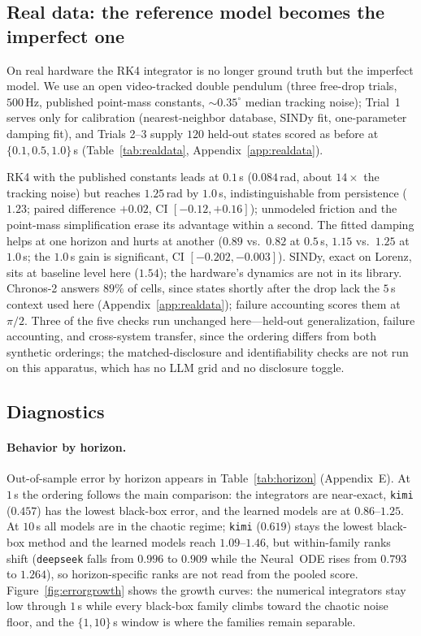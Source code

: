 \documentclass{article}
\begin{document}
\subsection{Real data: the reference model becomes the imperfect one}
\label{sec:realdata}
On real hardware the RK4 integrator is no longer ground truth but the imperfect model. We use
an open video-tracked double pendulum
\citep{myers2020pendulum} (three free-drop trials, $500$\,Hz, published point-mass constants,
${\sim}0.35^{\circ}$ median tracking noise); Trial~1 serves only for calibration (nearest-neighbor
database, SINDy fit, one-parameter damping fit), and Trials 2--3 supply $120$ held-out states
scored as before at $\{0.1,0.5,1.0\}$\,s (Table~\ref{tab:realdata},
Appendix~\ref{app:realdata}).

RK4 with the published constants leads at $0.1$\,s ($0.084$\,rad, about $14\times$ the
tracking noise) but reaches $1.25$\,rad by $1.0$\,s, indistinguishable from persistence
($1.23$; paired difference $+0.02$, CI $[-0.12,+0.16]$); unmodeled friction and the
point-mass simplification erase its advantage within a second. The fitted damping helps at one
horizon and hurts at another ($0.89$ vs.\ $0.82$ at $0.5$\,s, $1.15$ vs.\ $1.25$ at
$1.0$\,s; the $1.0$\,s gain is significant, CI $[-0.202,-0.003]$). SINDy, exact on Lorenz, sits at baseline level here
($1.54$); the hardware's dynamics are not in its library. Chronos-2 answers $89\%$ of cells,
since states shortly after the drop lack the $5$\,s context used here
(Appendix~\ref{app:realdata}); failure accounting scores them at $\pi/2$. Three of the five
checks run unchanged here---held-out generalization, failure accounting, and cross-system
transfer, since the ordering differs from both synthetic orderings; the matched-disclosure and
identifiability checks are not run on this apparatus, which has no LLM grid and no disclosure
toggle.

\subsection{Diagnostics}
\label{sec:behavior}
\paragraph{Behavior by horizon.}
Out-of-sample error by horizon appears in Table~\ref{tab:horizon} (Appendix~E). At $1$\,s the ordering
follows the main comparison: the integrators are near-exact, \texttt{kimi} ($0.457$) has the
lowest black-box error, and the learned models are at $0.86$--$1.25$. At $10$\,s all models
are in the chaotic regime; \texttt{kimi} ($0.619$) stays the lowest black-box method and the
learned models reach $1.09$--$1.46$, but within-family ranks shift (\texttt{deepseek} falls
from $0.996$ to $0.909$ while the Neural~ODE rises from $0.793$ to $1.264$), so horizon-specific
ranks are not read from the pooled score. Figure~\ref{fig:errorgrowth} shows the growth curves:
the numerical integrators stay low through $1$\,s while every black-box family climbs toward the
chaotic noise floor, and the $\{1,10\}$\,s window is where the families remain separable.
\end{document}
